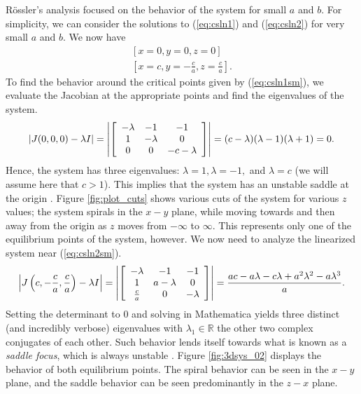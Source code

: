 \documentclass{article}
\begin{document}
R\"{o}ssler's analysis focused on the behavior of the system for small $a$ and $b$. For simplicity, we can consider the solutions to (\ref{eq:csln1}) and (\ref{eq:csln2}) for very small $a$ and $b$. We now have
\begin{gather}
	\left[
	x=0,
	y=0,
	z=0
	\right]\label{eq:csln1sm}\\
	\left[
	x=c,
	y=-\frac{c}{a},
	z=\frac{c}{a}
	\right]\label{eq:csln2sm}.
\end{gather}
To find the behavior around the critical points given by (\ref{eq:csln1sm}), we evaluate the Jacobian at the appropriate points and find the eigenvalues of the system.
\[
	|J(0,0,0)-\lambda I| =
	\left|
	\left[
	\begin{array}{c c c}
		-\lambda & -1       & -1         \\
		1        & -\lambda & 0          \\
		0        & 0        & -c-\lambda
	\end{array}
	\right]
	\right| =
	(c-\lambda)(\lambda-1)(\lambda + 1)=0.
\]
Hence, the system has three eigenvalues: $\lambda=1, \lambda=-1,$ and $\lambda = c$ (we will assume here that $c > 1$). This implies that the system has an unstable saddle at the origin \cite{equilibria}. Figure \ref{fig:plot_cuts} shows various cuts of the system for various $z$ values; the system spirals in the $x-y$ plane, while moving towards and then away from the origin as $z$ moves from $-\infty$ to $\infty$. This represents only one of the equilibrium points of the system, however. We now need to analyze the linearized system near (\ref{eq:csln2sm}).
\[
	\left|J\left(c,-\frac{c}{a},\frac{c}{a}\right) -\lambda I\right| =
	\left|
	\left[
	\begin{array}{c c c}
		-\lambda    & -1          & -1       \\
		1           & a - \lambda & 0        \\
		\frac{c}{a} & 0           & -\lambda
	\end{array}
	\right]
	\right| =
	\frac{ ac - a\lambda - c\lambda + a^{2}\lambda^{2} -a\lambda^{3}}{a}.
\]
Setting the determinant to $0$ and solving in Mathematica yields three distinct (and incredibly verbose) eigenvalues with $\lambda_{1}\in\mathbb{R}$ the other two complex conjugates of each other. Such behavior lends itself towards what is known as a \textit{saddle focus}, which is always unstable \cite{equilibria}. Figure \ref{fig:3dsys_02} displays the behavior of both equilibrium points. The spiral behavior can be seen in the $x-y$ plane, and the saddle behavior can be seen predominantly in the $z-x$ plane.
\end{document}

